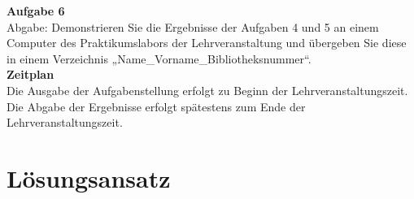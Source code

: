 \documentclass{scrartcl}
\begin{document}
        \textbf{Aufgabe 6} \\
        Abgabe: Demonstrieren Sie die Ergebnisse der Aufgaben 4 und 5 an einem Computer des
        Praktikumslabors der Lehrveranstaltung und übergeben Sie diese in einem Verzeichnis
        „Name\_Vorname\_Bibliotheksnummer“. \\

        \textbf{Zeitplan} \\
        Die Ausgabe der Aufgabenstellung erfolgt zu Beginn der Lehrveranstaltungszeit. Die Abgabe
        der Ergebnisse erfolgt spätestens zum Ende der Lehrveranstaltungszeit. \\

    \section{Lösungsansatz}
\end{document}
